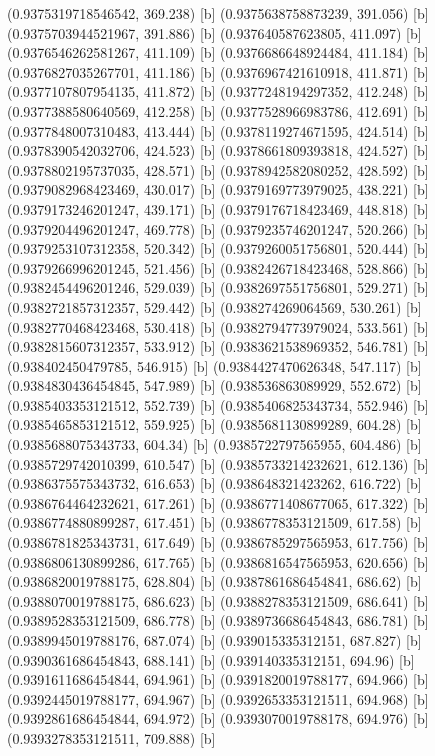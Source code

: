 {{{(0.9375319718546542, 369.238) [b] 
(0.9375638758873239, 391.056) [b] 
(0.9375703944521967, 391.886) [b] 
(0.937640587623805, 411.097) [b] 
(0.9376546262581267, 411.109) [b] 
(0.9376686648924484, 411.184) [b] 
(0.9376827035267701, 411.186) [b] 
(0.9376967421610918, 411.871) [b] 
(0.9377107807954135, 411.872) [b] 
(0.9377248194297352, 412.248) [b] 
(0.9377388580640569, 412.258) [b] 
(0.9377528966983786, 412.691) [b] 
(0.9377848007310483, 413.444) [b] 
(0.9378119274671595, 424.514) [b] 
(0.9378390542032706, 424.523) [b] 
(0.9378661809393818, 424.527) [b] 
(0.9378802195737035, 428.571) [b] 
(0.9378942582080252, 428.592) [b] 
(0.9379082968423469, 430.017) [b] 
(0.9379169773979025, 438.221) [b] 
(0.9379173246201247, 439.171) [b] 
(0.9379176718423469, 448.818) [b] 
(0.9379204496201247, 469.778) [b] 
(0.9379235746201247, 520.266) [b] 
(0.9379253107312358, 520.342) [b] 
(0.9379260051756801, 520.444) [b] 
(0.9379266996201245, 521.456) [b] 
(0.9382426718423468, 528.866) [b] 
(0.9382454496201246, 529.039) [b] 
(0.9382697551756801, 529.271) [b] 
(0.9382721857312357, 529.442) [b] 
(0.938274269064569, 530.261) [b] 
(0.9382770468423468, 530.418) [b] 
(0.9382794773979024, 533.561) [b] 
(0.9382815607312357, 533.912) [b] 
(0.9383621538969352, 546.781) [b] 
(0.938402450479785, 546.915) [b] 
(0.9384427470626348, 547.117) [b] 
(0.9384830436454845, 547.989) [b] 
(0.938536863089929, 552.672) [b] 
(0.9385403353121512, 552.739) [b] 
(0.9385406825343734, 552.946) [b] 
(0.9385465853121512, 559.925) [b] 
(0.9385681130899289, 604.28) [b] 
(0.9385688075343733, 604.34) [b] 
(0.9385722797565955, 604.486) [b] 
(0.9385729742010399, 610.547) [b] 
(0.9385733214232621, 612.136) [b] 
(0.9386375575343732, 616.653) [b] 
(0.938648321423262, 616.722) [b] 
(0.9386764464232621, 617.261) [b] 
(0.9386771408677065, 617.322) [b] 
(0.9386774880899287, 617.451) [b] 
(0.9386778353121509, 617.58) [b] 
(0.9386781825343731, 617.649) [b] 
(0.9386785297565953, 617.756) [b] 
(0.9386806130899286, 617.765) [b] 
(0.9386816547565953, 620.656) [b] 
(0.9386820019788175, 628.804) [b] 
(0.9387861686454841, 686.62) [b] 
(0.9388070019788175, 686.623) [b] 
(0.9388278353121509, 686.641) [b] 
(0.9389528353121509, 686.778) [b] 
(0.9389736686454843, 686.781) [b] 
(0.9389945019788176, 687.074) [b] 
(0.939015335312151, 687.827) [b] 
(0.9390361686454843, 688.141) [b] 
(0.939140335312151, 694.96) [b] 
(0.9391611686454844, 694.961) [b] 
(0.9391820019788177, 694.966) [b] 
(0.9392445019788177, 694.967) [b] 
(0.9392653353121511, 694.968) [b] 
(0.9392861686454844, 694.972) [b] 
(0.9393070019788178, 694.976) [b] 
(0.9393278353121511, 709.888) [b] 
}}}
